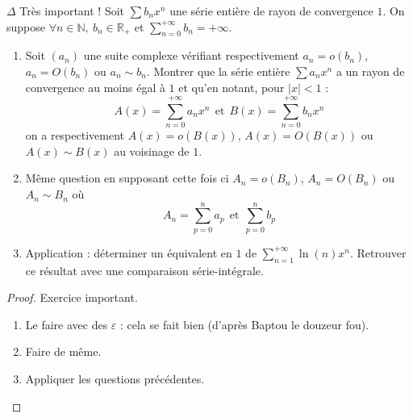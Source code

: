 \documentclass[french,a4paper]{article}
\newcommand{\N}{\mathbb{N}}
\newcommand{\R}{\mathbb{R}}
\theoremstyle{plain}
\theoremstyle{definition}
\theoremstyle{remark}
\begin{document}
\begin{ex}[Moulin.SE.11]{$\Delta$ Très important !}
	Soit $\sum b_nx^n$ une série entière de rayon de convergence $1$. On suppose $\forall n\in\N,\ b_n\in\R_+$ et $\displaystyle\sum_{n=0}^{+\infty}b_n=+\infty$.
	\begin{enumerate}
		\item Soit $(a_n)$ une suite complexe vérifiant respectivement $a_n=o(b_n)$, $a_n=O(b_n)$ ou $a_n\sim b_n$. Montrer que la série entière $\sum a_nx^n$ a un rayon de convergence au moins égal à $1$ et qu'en notant, pour $\lvert x\rvert<1$ : $$A(x)=\sum_{n=0}^{+\infty}a_nx^n \ \ \text{et}\ \ B(x)=\sum_{n=0}^{+\infty}b_nx^n$$ on a respectivement 
		$A(x)=o(B(x))$, $A(x)=O(B(x))$ ou $A(x)\sim B(x)$ au voisinage de $1$.
		\item Même question en supposant cette fois ci $A_n=o(B_n)$, $A_n=O(B_n)$ ou $A_n\sim B_n$ où $$A_n=\sum_{p=0}^{n}a_p\ \ \text{et} \ \ \sum_{p=0}^{n}b_p$$
		\item Application : déterminer un équivalent en $1$ de $\displaystyle\sum_{n=1}^{+\infty}\ln(n)x^n$. Retrouver ce résultat avec une comparaison série-intégrale.
	\end{enumerate}
\end{ex}
\begin{proof}
	Exercice important.
	\begin{enumerate}
		\item Le faire avec des $\varepsilon$ : cela se fait bien (d'après Baptou le douzeur fou).
		\item Faire de même.
		\item Appliquer les questions précédentes.
	\end{enumerate}
\end{proof}
\end{document}
